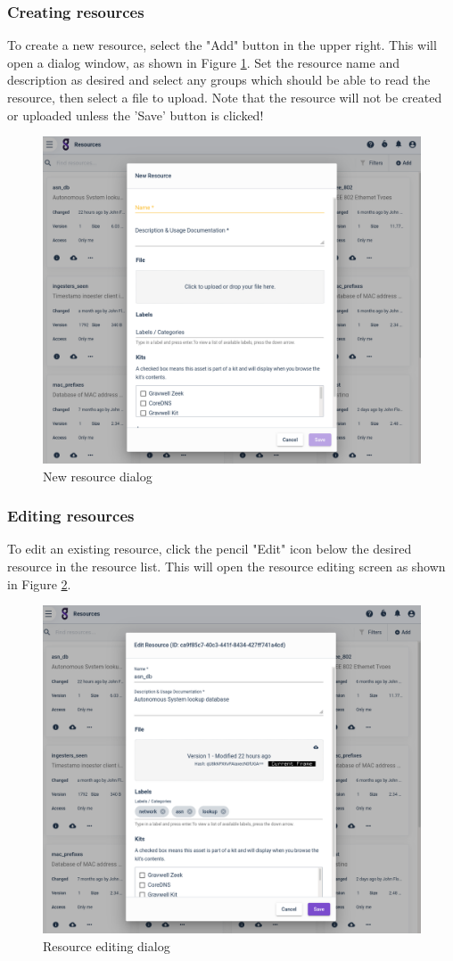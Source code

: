 \subsubsection{Creating resources}

To create a new resource, select the "Add" button in the upper right. This
will open a dialog window, as shown in Figure \ref{fig:resource-new}.
Set the resource name and description as desired and select any groups
which should be able to read the resource, then select a file to upload.
Note that the resource will not be created or uploaded unless the 'Save'
button is clicked!

\begin{figure}
	\includegraphics[width=0.7\linewidth]{images/resource-new.png}
	\caption{New resource dialog}
	\label{fig:resource-new}
\end{figure}

\subsubsection{Editing resources}

To edit an existing resource, click the pencil "Edit" icon below the
desired resource in the resource list. This will open the resource
editing screen as shown in Figure \ref{fig:resource-edit}.

\begin{figure}
	\includegraphics[width=0.7\linewidth]{images/resource-edit.png}
	\caption{Resource editing dialog}
	\label{fig:resource-edit}
\end{figure}


